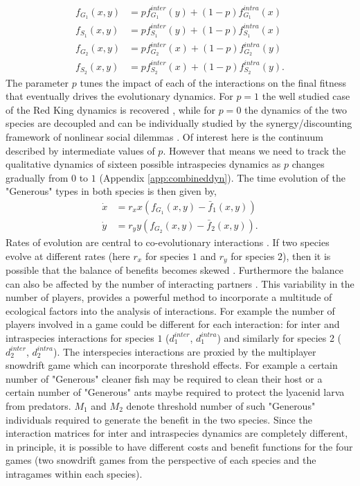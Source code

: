 \documentclass[12pt]{article}
\begin{document}
%
\begin{align}
	f_{G_1} (x,y) &= p f^{inter}_{G_1} (y) + (1-p) f^{intra}_{G_1} (x) \\
	f_{S_1} (x,y) &= p f^{inter}_{S_1} (y) + (1-p) f^{intra}_{S_1} (x)  \\
	f_{G_2} (x,y) &= p f^{inter}_{G_2} (x) + (1-p) f^{intra}_{G_2} (y) \\
	f_{S_2} (x,y) &= p f^{inter}_{S_2} (x) + (1-p) f^{intra}_{S_2} (y).
\label{eq:combinedfiteqs}
\end{align}
%
The parameter $p$ tunes the impact of each of the interactions on the final fitness that eventually drives the evolutionary dynamics. For $p=1$ the well studied case of the Red King dynamics is recovered \citep{gokhale:PRSB:2012}, while for $p=0$ the dynamics of the two species are decoupled and can be individually studied by the synergy/discounting framework of nonlinear social dilemmas \citep{hauert:JTB:2006a}. 
Of interest here is the continuum described by intermediate values of $p$. However that means we need to track the qualitative dynamics of sixteen possible intraspecies dynamics as $p$ changes gradually from $0$ to $1$ (Appendix \ref{app:combineddyn}). The time evolution of the "Generous" types in both species is then given by,
%
\begin{align}
\dot{x} &= r_x x \left(f_{G_1}(x,y) -  \bar{f}_1(x,y) \right)  \\
\dot{y} &= r_y y \left(f_{G_2}(x,y) -  \bar{f}_2(x,y) \right).
\label{eq:repeq}
\end{align}
%
Rates of evolution are central to co-evolutionary interactions \citep{salathe:TREE:2008}. 
If two species evolve at different rates (here $r_x$ for species $1$ and $r_y$ for species $2$), then it is possible that the balance of benefits becomes skewed \citep{bergstrom:PNAS:2003}. 
Furthermore the balance can also be affected by the number of interacting partners \citep{gokhale:PRSB:2012}. 
This variability in the number of players, provides a powerful method to incorporate a multitude of ecological factors into the analysis of interactions. For example the number of players involved in a game could be different for each interaction: for inter and intraspecies interactions for species $1$ ($d^{inter}_1$, $d^{intra}_1$) and similarly for species 2 ($d^{inter}_2$, $d^{intra}_2$). The interspecies interactions are proxied by the multiplayer snowdrift game which can incorporate threshold effects. For example a certain number of "Generous" cleaner fish may be required to clean their host or a certain number of "Generous" ants maybe required to protect the lyacenid larva from predators. $M_1$ and $M_2$ denote threshold number of such "Generous" individuals required to generate the benefit in the two species. Since the interaction matrices for inter and intraspecies dynamics are completely different, in principle, it is possible to have different costs and benefit functions for the four games (two snowdrift games from the perspective of each species and the intragames within each species).
\end{document}
